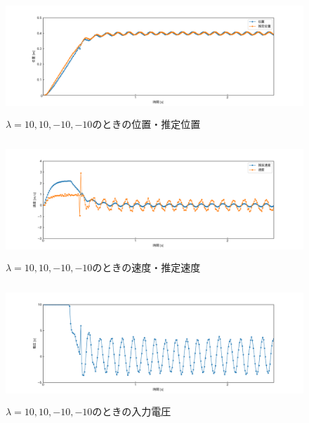 \documentclass[12pt]{jsarticle}
\begin{document}
\begin{figure}[H]
  \begin{center}
    \includegraphics[clip,width=13.0cm, height=4.4cm]{../img/Exp4-1.png}
    \caption{$\lambda=10, 10, -10, -10$のときの位置・推定位置}
    \label{Exp4-1}
  \end{center}
\end{figure}
\begin{figure}[H]
  \begin{center}
    \includegraphics[clip,width=13.0cm, height=4.4cm]{../img/Exp4-2.png}
    \caption{$\lambda=10, 10, -10, -10$のときの速度・推定速度}
    \label{Exp4-2}
  \end{center}
\end{figure}
\begin{figure}[H]
  \begin{center}
    \includegraphics[clip,width=13.0cm, height=4.4cm]{../img/Exp4-3.png}
    \caption{$\lambda=10, 10, -10, -10$のときの入力電圧}
    \label{Exp4-3}
  \end{center}
\end{figure}
\end{document}
